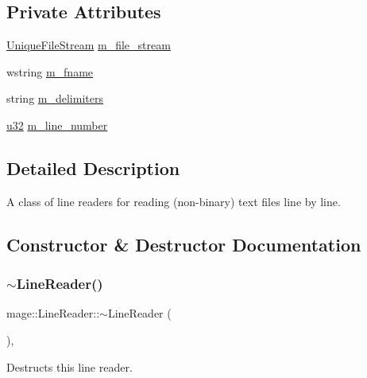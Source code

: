 \subsection*{Private Attributes}
\begin{DoxyCompactItemize}
\item 
\hyperlink{namespacemage_a0ee1bd45ad7dbb3dc8c8e1770e3538d4}{Unique\+File\+Stream} \hyperlink{classmage_1_1_line_reader_a510ff5355c6d26d7c29dc692ef18a3e2}{m\+\_\+file\+\_\+stream}
\item 
wstring \hyperlink{classmage_1_1_line_reader_ad6f55ba12fc610ab2fc1c26a48d12321}{m\+\_\+fname}
\item 
string \hyperlink{classmage_1_1_line_reader_a6de3398ac59fdd98f8c40cff6f5c1075}{m\+\_\+delimiters}
\item 
\hyperlink{namespacemage_af2b398bf98eb10351f49cad73fe2cc73}{u32} \hyperlink{classmage_1_1_line_reader_ad38c64a46fef8e7bf8d7429b99a73746}{m\+\_\+line\+\_\+number}
\end{DoxyCompactItemize}


\subsection{Detailed Description}
A class of line readers for reading (non-\/binary) text files line by line. 

\subsection{Constructor \& Destructor Documentation}
\hypertarget{classmage_1_1_line_reader_ad9753ea392ebe5b3867852d3392fb1e7}{}\label{classmage_1_1_line_reader_ad9753ea392ebe5b3867852d3392fb1e7} 
\subsubsection{\texorpdfstring{$\sim$\+Line\+Reader()}{~LineReader()}}
{\footnotesize\ttfamily mage\+::\+Line\+Reader\+::$\sim$\+Line\+Reader (\begin{DoxyParamCaption}{ }\end{DoxyParamCaption})\hspace{0.3cm}{\ttfamily [virtual]}, {\ttfamily [default]}}

Destructs this line reader. \hypertarget{classmage_1_1_line_reader_ab4a46321d7ea3ecda2d6390c78a7285b}{}\label{classmage_1_1_line_reader_ab4a46321d7ea3ecda2d6390c78a7285b} 

